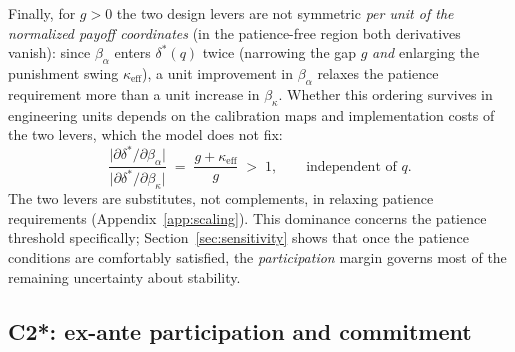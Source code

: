 \documentclass[manuscript,screen,review]{jair}
\begin{document}
Finally, for $g > 0$ the two design levers are not symmetric \emph{per unit of the normalized payoff coordinates} (in the patience-free region both derivatives vanish): since $\beta_\alpha$ enters $\delta^*(q)$ twice (narrowing the gap $g$ \emph{and} enlarging the punishment swing $\kappa_{\mathrm{eff}}$), a unit improvement in $\beta_\alpha$ relaxes the patience requirement more than a unit increase in $\beta_\kappa$. Whether this ordering survives in engineering units depends on the calibration maps and implementation costs of the two levers, which the model does not fix:
\begin{equation}
\frac{\bigl|\partial \delta^{*}/\partial \beta_\alpha\bigr|}{\bigl|\partial \delta^{*}/\partial \beta_\kappa\bigr|}
\;=\; \frac{g + \kappa_{\mathrm{eff}}}{g} \;>\; 1 ,
\qquad \text{independent of } q .
\label{eq:leverratio}
\end{equation}
The two levers are substitutes, not complements, in relaxing patience requirements (Appendix~\ref{app:scaling}). This dominance concerns the patience threshold specifically; Section~\ref{sec:sensitivity} shows that once the patience conditions are comfortably satisfied, the \emph{participation} margin governs most of the remaining uncertainty about stability.

\subsection{C2*: ex-ante participation and commitment}
\label{sec:c2star}
\end{document}
